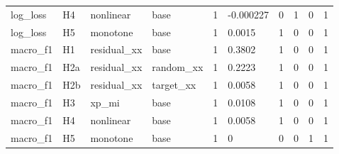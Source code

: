 \begin{tabular}{llllllllll}
log\_loss & H4 & nonlinear & base & 1 & -0.000227 & 0 & 1 & 0 & 1 \\
log\_loss & H5 & monotone & base & 1 & 0.0015 & 1 & 0 & 0 & 1 \\
macro\_f1 & H1 & residual\_xx & base & 1 & 0.3802 & 1 & 0 & 0 & 1 \\
macro\_f1 & H2a & residual\_xx & random\_xx & 1 & 0.2223 & 1 & 0 & 0 & 1 \\
macro\_f1 & H2b & residual\_xx & target\_xx & 1 & 0.0058 & 1 & 0 & 0 & 1 \\
macro\_f1 & H3 & xp\_mi & base & 1 & 0.0108 & 1 & 0 & 0 & 1 \\
macro\_f1 & H4 & nonlinear & base & 1 & 0.0058 & 1 & 0 & 0 & 1 \\
macro\_f1 & H5 & monotone & base & 1 & 0 & 0 & 0 & 1 & 1 \\
\bottomrule
\end{tabular}
